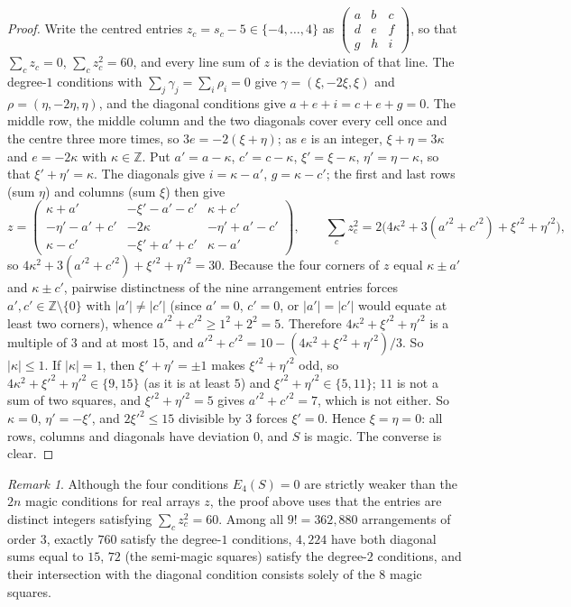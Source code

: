 \documentclass[11pt,a4paper]{article}
\theoremstyle{plain}
\theoremstyle{definition}
\theoremstyle{remark}
\newtheorem{remark}[theorem]{Remark}
\newcommand{\Z}{\mathbb{Z}}
\newcommand{\Efour}{E_4}
\begin{document}
\begin{proof}
Write the centred entries $z_c=s_c-5\in\{-4,\dots,4\}$ as $\left(\begin{smallmatrix}a&b&c\\d&e&f\\g&h&i\end{smallmatrix}\right)$, so that $\sum_cz_c=0$, $\sum_cz_c^2=60$, and every line sum of $z$ is the deviation of that line.
The degree-$1$ conditions with $\sum_j\gamma_j=\sum_i\rho_i=0$ give $\gamma=(\xi,-2\xi,\xi)$ and $\rho=(\eta,-2\eta,\eta)$, and the diagonal conditions give $a+e+i=c+e+g=0$.
The middle row, the middle column and the two diagonals cover every cell once and the centre three more times, so $3e=-2(\xi+\eta)$; as $e$ is an integer, $\xi+\eta=3\kappa$ and $e=-2\kappa$ with $\kappa\in\Z$.
Put $a'=a-\kappa$, $c'=c-\kappa$, $\xi'=\xi-\kappa$, $\eta'=\eta-\kappa$, so that $\xi'+\eta'=\kappa$.
The diagonals give $i=\kappa-a'$, $g=\kappa-c'$; the first and last rows (sum $\eta$) and columns (sum $\xi$) then give
\[
z=\begin{pmatrix}\kappa+a'&-\xi'-a'-c'&\kappa+c'\\-\eta'-a'+c'&-2\kappa&-\eta'+a'-c'\\\kappa-c'&-\xi'+a'+c'&\kappa-a'\end{pmatrix},
\qquad
\sum_cz_c^2=2\bigl(4\kappa^2+3(a'^2+c'^2)+\xi'^2+\eta'^2\bigr),
\]
so $4\kappa^2+3(a'^2+c'^2)+\xi'^2+\eta'^2=30$.
Because the four corners of $z$ equal $\kappa\pm a'$ and $\kappa\pm c'$, pairwise distinctness of the nine arrangement entries forces $a',c'\in\Z\setminus\{0\}$ with $|a'|\ne|c'|$ (since $a'=0$, $c'=0$, or $|a'|=|c'|$ would equate at least two corners), whence $a'^2+c'^2\ge 1^2+2^2=5$. Therefore $4\kappa^2+\xi'^2+\eta'^2$ is a multiple of $3$ and at most $15$, and $a'^2+c'^2=10-(4\kappa^2+\xi'^2+\eta'^2)/3$.
So $|\kappa|\le1$.
If $|\kappa|=1$, then $\xi'+\eta'=\pm1$ makes $\xi'^2+\eta'^2$ odd, so $4\kappa^2+\xi'^2+\eta'^2\in\{9,15\}$ (as it is at least $5$) and $\xi'^2+\eta'^2\in\{5,11\}$; $11$ is not a sum of two squares, and $\xi'^2+\eta'^2=5$ gives $a'^2+c'^2=7$, which is not either.
So $\kappa=0$, $\eta'=-\xi'$, and $2\xi'^2\le15$ divisible by $3$ forces $\xi'=0$.
Hence $\xi=\eta=0$: all rows, columns and diagonals have deviation $0$, and $S$ is magic.
The converse is clear.
\end{proof}

\begin{remark}
\label{rem:n3_enum}
Although the four conditions $\Efour(S)=0$ are strictly weaker than the $2n$ magic conditions for real arrays $z$, the proof above uses that the entries are distinct integers satisfying $\sum_cz_c^2=60$. Among all $9!=362{,}880$ arrangements of order $3$, exactly $760$ satisfy the degree-$1$ conditions, $4{,}224$ have both diagonal sums equal to $15$, $72$ (the semi-magic squares) satisfy the degree-$2$ conditions, and their intersection with the diagonal condition consists solely of the $8$ magic squares.
\end{remark}
\end{document}
